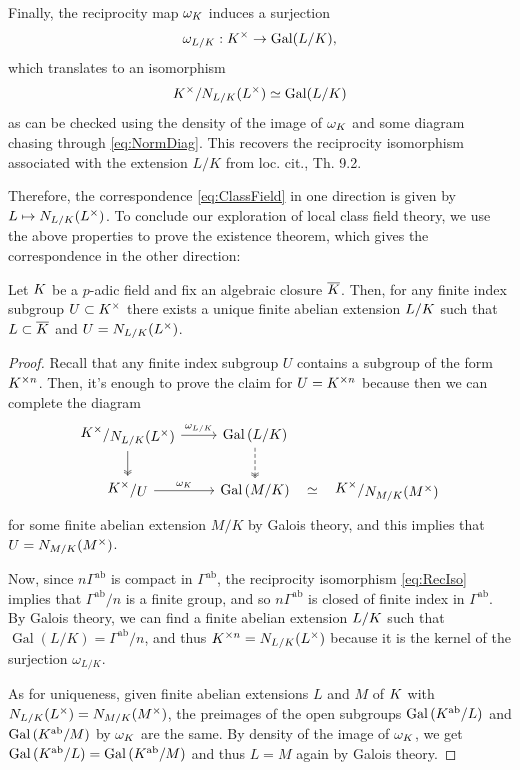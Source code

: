 \documentclass[a4paper, oneside]{memoir}
\begin{document}
\begin{remark}
	Finally, the reciprocity map $\omega_K$ induces a surjection
	\[
		\omega_{L/K}:K^\times \to \operatorname{Gal}(L/K),
	\]
	which translates to an isomorphism \[K^\times / N_{L/K}(L^\times) \simeq \operatorname{Gal}(L/K)\]
	as can be checked using the density of the image of $\omega_K$ and some diagram chasing through \eqref{eq:NormDiag}.
	This recovers the reciprocity isomorphism associated with the extension $L/K$ from loc. cit., Th. 9.2.
\end{remark}

Therefore, the correspondence \eqref{eq:ClassField} in one direction is given by $L \mapsto N_{L/K}(L^\times)$. To conclude our exploration of local class field theory, we use the above properties to prove the existence theorem, which gives the correspondence in the other direction:

\begin{theorem}
	Let $K$ be a $p$-adic field and fix an algebraic closure $\overline{K}$. Then, for any finite index subgroup $U\subset K^\times$
	there exists a unique finite abelian extension $L / K$ such that $L \subset \overline{K}$ and $U=N_{L/K}(L^\times)$.
\end{theorem}

\begin{proof}
	Recall that any finite index subgroup $U$ contains a subgroup of the form $K^{\times n}$. Then, it's enough to prove the claim for $U=K^{\times n}$ because then we can complete the diagram
	\[
		\begin{tikzcd}
			\ssfrac{\K^\times}{N_{L/\K}(L^\times)} \ar[r, "\omega_{L/\K}"] \ar[d, twoheadrightarrow] & \operatorname{Gal}{(L/K)} \ar[d, dashed, twoheadrightarrow] &\\
			\ssfrac{\K^\times}{U} \ar[r, "\omega_K"] & \operatorname{Gal}{(M/K)}\ar[r, phantom, "\simeq"] &\ssfrac{\K^\times}{N_{M/\K}(M^\times)}
		\end{tikzcd}
	\]
	for some finite abelian extension $M/K$ by Galois theory, and this implies that $U=N_{M/K}(M^\times)$.

	Now, since $n\Gamma^{\text{ab}}$ is compact in $\Gamma^{\text{ab}}$, the reciprocity isomorphism \eqref{eq:RecIso} implies that $\Gamma^{\text{ab}}/n$ is a finite group, and so $n\Gamma^{\text{ab}}$ is closed of finite index in $\Gamma^{\text{ab}}$. By Galois theory, we can find a finite abelian extension $L/K$ such that $\operatorname{Gal}{(L/K)}=\Gamma^{\text{ab}}/n$, and thus $K^{\times n}=N_{L/K}(L^\times)$ because it is the kernel of the surjection $\omega_{L/K}$.

	As for uniqueness, given finite abelian extensions $L$ and $M$ of $K$ with $N_{L/K}(L^\times)=N_{M/K}(M^\times)$, the preimages of the open subgroups $\operatorname{Gal}{(K^\text{ab}/L)}$ and $\operatorname{Gal}{(K^\text{ab}/M)}$ by $\omega_K$ are the same. By density of the image of $\omega_K$, we get $\operatorname{Gal}{(K^\text{ab}/L)}=\operatorname{Gal}{(K^\text{ab}/M)}$ and thus $L=M$ again by Galois theory.
\end{proof}

\nocite{*}
\printbibliography
\end{document}
